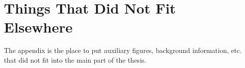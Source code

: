 \chapter{Things That Did Not Fit Elsewhere}
The appendix is the place to put auxiliary figures, background information, etc. that did not fit into the main part of the thesis.